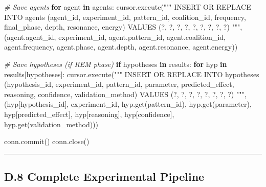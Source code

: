 \documentclass[
]{article}
\newenvironment{Shaded}{}{}
\newcommand{\CommentTok}[1]{\textcolor[rgb]{0.38,0.63,0.69}{\textit{#1}}}
\newcommand{\ControlFlowTok}[1]{\textcolor[rgb]{0.00,0.44,0.13}{\textbf{#1}}}
\newcommand{\KeywordTok}[1]{\textcolor[rgb]{0.00,0.44,0.13}{\textbf{#1}}}
\newcommand{\NormalTok}[1]{#1}
\newcommand{\StringTok}[1]{\textcolor[rgb]{0.25,0.44,0.63}{#1}}
\begin{document}
\begin{Shaded}
\begin{Highlighting}[]
    \CommentTok{\# Save agents}
    \ControlFlowTok{for}\NormalTok{ agent }\KeywordTok{in}\NormalTok{ agents:}
\NormalTok{        cursor.execute(}\StringTok{"""}
\StringTok{            INSERT OR REPLACE INTO agents}
\StringTok{            (agent\_id, experiment\_id, pattern\_id, coalition\_id, frequency,}
\StringTok{             final\_phase, depth, resonance, energy)}
\StringTok{            VALUES (?, ?, ?, ?, ?, ?, ?, ?, ?)}
\StringTok{        """}\NormalTok{, (agent.agent\_id, experiment\_id, agent.pattern\_id, agent.coalition\_id,}
\NormalTok{              agent.frequency, agent.phase, agent.depth, agent.resonance, agent.energy))}

    \CommentTok{\# Save hypotheses (if REM phase)}
    \ControlFlowTok{if} \StringTok{\textquotesingle{}hypotheses\textquotesingle{}} \KeywordTok{in}\NormalTok{ results:}
        \ControlFlowTok{for}\NormalTok{ hyp }\KeywordTok{in}\NormalTok{ results[}\StringTok{\textquotesingle{}hypotheses\textquotesingle{}}\NormalTok{]:}
\NormalTok{            cursor.execute(}\StringTok{"""}
\StringTok{                INSERT OR REPLACE INTO hypotheses}
\StringTok{                (hypothesis\_id, experiment\_id, pattern\_id, parameter,}
\StringTok{                 predicted\_effect, reasoning, confidence, validation\_method)}
\StringTok{                VALUES (?, ?, ?, ?, ?, ?, ?, ?)}
\StringTok{            """}\NormalTok{, (hyp[}\StringTok{\textquotesingle{}hypothesis\_id\textquotesingle{}}\NormalTok{], experiment\_id, hyp.get(}\StringTok{\textquotesingle{}pattern\_id\textquotesingle{}}\NormalTok{),}
\NormalTok{                  hyp.get(}\StringTok{\textquotesingle{}parameter\textquotesingle{}}\NormalTok{), hyp[}\StringTok{\textquotesingle{}predicted\_effect\textquotesingle{}}\NormalTok{], hyp[}\StringTok{\textquotesingle{}reasoning\textquotesingle{}}\NormalTok{],}
\NormalTok{                  hyp[}\StringTok{\textquotesingle{}confidence\textquotesingle{}}\NormalTok{], hyp.get(}\StringTok{\textquotesingle{}validation\_method\textquotesingle{}}\NormalTok{)))}

\NormalTok{    conn.commit()}
\NormalTok{    conn.close()}
\end{Highlighting}
\end{Shaded}

\begin{center}\rule{0.5\linewidth}{0.5pt}\end{center}

\subsection{D.8 Complete Experimental
Pipeline}\label{d.8-complete-experimental-pipeline}
\end{document}
